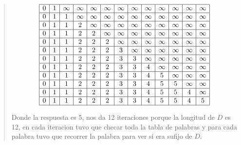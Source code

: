 \begin{quote}
    $$
    \begin{array}{|c|c|c|c|c|c|c|c|c|c|c|c|c|}
        \hline
        0 & 1 & \infty & \infty & \infty & \infty & \infty & \infty & \infty & \infty & \infty & \infty & \infty \\
        \hline
        0 & 1 & 1 & \infty & \infty & \infty & \infty & \infty & \infty & \infty & \infty & \infty & \infty \\
        \hline
        0 & 1 & 1 & 2 & \infty & \infty & \infty & \infty & \infty & \infty & \infty & \infty & \infty \\
        \hline
        0 & 1 & 1 & 2 & 2 & \infty & \infty & \infty & \infty & \infty & \infty & \infty & \infty \\
        \hline
        0 & 1 & 1 & 2 & 2 & 2 & \infty & \infty & \infty & \infty & \infty & \infty & \infty \\
        \hline
        0 & 1 & 1 & 2 & 2 & 2 & 3 & \infty & \infty & \infty & \infty & \infty & \infty \\
        \hline
        0 & 1 & 1 & 2 & 2 & 2 & 3 & 3 & \infty & \infty & \infty & \infty & \infty \\
        \hline
        0 & 1 & 1 & 2 & 2 & 2 & 3 & 3 & 4 & \infty & \infty & \infty & \infty \\
        \hline
        0 & 1 & 1 & 2 & 2 & 2 & 3 & 3 & 4 & 5 & \infty & \infty & \infty \\
        \hline
        0 & 1 & 1 & 2 & 2 & 2 & 3 & 3 & 4 & 5 & 5 & \infty & \infty \\
        \hline
        0 & 1 & 1 & 2 & 2 & 2 & 3 & 3 & 4 & 5 & 5 & 4 & \infty \\
        \hline
        0 & 1 & 1 & 2 & 2 & 2 & 3 & 3 & 4 & 5 & 5 & 4 & 5 \\
        \hline
    \end{array}
    $$ \vspace{.2cm}

    Donde la respuesta es 5, nos da 12 iteraciones porque la longitud de $D$ es 12, en cada iteracion tuvo que checar toda la tabla de palabras y para cada palabra tuvo que recorrer la palabra para ver si era sufijo de $D$. \vspace{.2cm}
\end{quote}